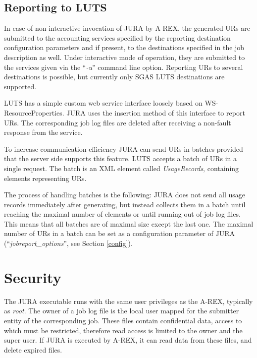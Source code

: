\documentclass{article}                            %
\begin{document}



\subsection{Reporting to LUTS}
\label{accessing}
In case of non-interactive invocation of JURA by A-REX, 
the generated URs are submitted to the accounting services specified
by the reporting destination configuration parameters and if present,
to the destinations specified in the job description as
well. Under interactive mode of operation, they are submitted to the
services given via the ``\textit{-u}'' command line option. Reporting
URs to several destinations is possible, but currently
only SGAS LUTS destinations are supported.

LUTS has a simple custom web service interface loosely based on
WS-ResourceProperties\cite{wsrp}. JURA uses the insertion method of
this interface to report URs. The corresponding job log files are
deleted after receiving a non-fault response from the service.





To increase communication efficiency JURA can send URs in batches
provided that the server side supports this feature. LUTS accepts a
batch of URs in a single request. The batch is an XML element called
\textit{UsageRecords}, containing elements representing URs. 

The process of handling batches is the following: JURA does not send
all usage records immediately after generating, but instead collects
them in a batch until reaching the maximal number of elements or until
running out of job log files. This means that all batches are of
maximal size except the last one. The maximal number of URs in a batch
can be set as a configuration parameter of JURA
(``\textit{jobreport\_options}'', see Section \ref{config}).


\section{Security}
The JURA executable runs with the same user privileges as the A-REX,
typically as \textit{root}. The owner of a job log file is the local
user mapped for the submitter entity of the corresponding job. These
files contain confidential data, access to which must be restricted,
therefore read access is limited to the owner and the super user. If
JURA is executed by A-REX, it can read data from these files, and
delete expired files.
\end{document}
